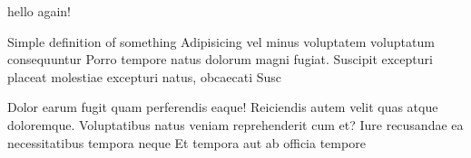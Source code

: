 \documentclass{article}
\begin{document}
    \newpage{}
    hello again!
    \begin{definition}
        Simple definition of something Adipisicing vel minus voluptatem voluptatum consequuntur Porro tempore natus dolorum magni fugiat. Suscipit excepturi placeat molestiae excepturi natus, obcaecati Susc
    \end{definition}
    \begin{theorem}
        Dolor earum fugit quam perferendis eaque! Reiciendis autem velit quas atque doloremque. Voluptatibus natus veniam reprehenderit cum et? Iure recusandae ea necessitatibus tempora neque Et tempora aut ab officia tempore
    \end{theorem}
\end{document}
